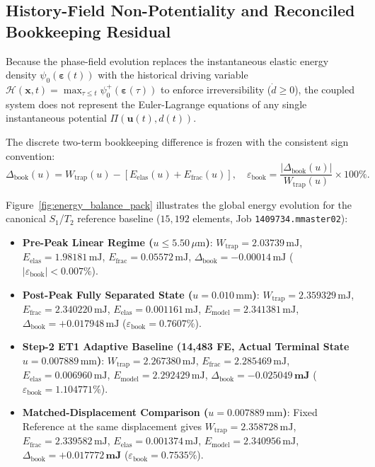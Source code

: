 \subsection{History-Field Non-Potentiality and Reconciled Bookkeeping Residual}
Because the phase-field evolution replaces the instantaneous elastic energy density $\psi_0(\boldsymbol{\varepsilon}(t))$ with the historical driving variable $\mathcal{H}(\mathbf{x}, t) = \max_{\tau \le t} \psi_0^+(\boldsymbol{\varepsilon}(\tau))$ to enforce irreversibility ($\dot{d} \ge 0$), the coupled system does not represent the Euler-Lagrange equations of any single instantaneous potential $\Pi(\mathbf{u}(t), d(t))$. 

The discrete two-term bookkeeping difference is frozen with the consistent sign convention:
\begin{equation}
  \Delta_{\mathrm{book}}(u) = W_{\mathrm{trap}}(u) - \left[ E_{\mathrm{elas}}(u) + E_{\mathrm{frac}}(u) \right], \quad \varepsilon_{\mathrm{book}} = \frac{|\Delta_{\mathrm{book}}(u)|}{W_{\mathrm{trap}}(u)} \times 100\%.
\end{equation}

Figure~\ref{fig:energy_balance_pack} illustrates the global energy evolution for the canonical $S_1$/$T_2$ reference baseline ($15{,}192$ elements, Job \texttt{1409734.mmaster02}):
\begin{itemize}
  \item \textbf{Pre-Peak Linear Regime ($u \le 5.50\,\mu\mathrm{m}$)}: $W_{\mathrm{trap}} = 2.03739\,\mathrm{mJ}$, $E_{\mathrm{elas}} = 1.98181\,\mathrm{mJ}$, $E_{\mathrm{frac}} = 0.05572\,\mathrm{mJ}$, $\Delta_{\mathrm{book}} = -0.00014\,\mathrm{mJ}$ ($|\varepsilon_{\mathrm{book}}| < 0.007\%$).
  \item \textbf{Post-Peak Fully Separated State ($u = 0.010\,\text{mm}$)}: $W_{\mathrm{trap}} = 2.359329\,\mathrm{mJ}$, $E_{\mathrm{frac}} = 2.340220\,\mathrm{mJ}$, $E_{\mathrm{elas}} = 0.001161\,\mathrm{mJ}$, $E_{\mathrm{model}} = 2.341381\,\mathrm{mJ}$, $\Delta_{\mathrm{book}} = \mathbf{+0.017948\,\mathrm{mJ}}$ ($\varepsilon_{\mathrm{book}} = \mathbf{0.7607\%}$).
  \item \textbf{Step-2 ET1 Adaptive Baseline (14,483 FE, Actual Terminal State $u = 0.007889\,\text{mm}$)}: $W_{\mathrm{trap}} = 2.267380\,\mathrm{mJ}$, $E_{\mathrm{frac}} = 2.285469\,\mathrm{mJ}$, $E_{\mathrm{elas}} = 0.006960\,\mathrm{mJ}$, $E_{\mathrm{model}} = 2.292429\,\mathrm{mJ}$, $\Delta_{\mathrm{book}} = \mathbf{-0.025049\,\text{mJ}}$ ($\varepsilon_{\mathrm{book}} = \mathbf{1.104771\%}$).
  \item \textbf{Matched-Displacement Comparison ($u = 0.007889\,\text{mm}$)}: Fixed Reference at the same displacement gives $W_{\mathrm{trap}} = 2.358728\,\mathrm{mJ}$, $E_{\mathrm{frac}} = 2.339582\,\mathrm{mJ}$, $E_{\mathrm{elas}} = 0.001374\,\mathrm{mJ}$, $E_{\mathrm{model}} = 2.340956\,\mathrm{mJ}$, $\Delta_{\mathrm{book}} = \mathbf{+0.017772\,\text{mJ}}$ ($\varepsilon_{\mathrm{book}} = \mathbf{0.7535\%}$).
\end{itemize}


